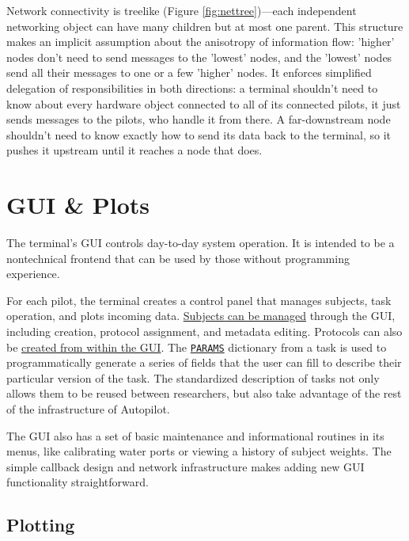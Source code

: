 \documentclass[nohyper, justified, notitlepage, marginals=raggedright,twoside=false,debug]{tufte-autopilot}
\begin{document}
Network connectivity is treelike (Figure \ref{fig:nettree})---each independent networking object can have many children but at most one parent. This structure makes an implicit assumption about the anisotropy of information flow: 'higher' nodes don't need to send messages to the 'lowest' nodes, and the 'lowest' nodes send all their messages to one or a few 'higher' nodes. It enforces simplified delegation of responsibilities in both directions: a terminal shouldn't need to know about every hardware object connected to all of its connected pilots, it just sends messages to the pilots, who handle it from there. A far-downstream node shouldn't need to know exactly how to send its data back to the terminal, so it pushes it upstream until it reaches a node that does.
\clearpage
\section{GUI \& Plots}
\label{sec:ui}

The terminal's GUI controls day-to-day system operation. It is intended to be a nontechnical frontend that can be used by those without programming experience. 

For each pilot, the terminal creates a control panel that manages subjects, task operation, and plots incoming data. \href{http://docs.auto-pi-lot.com/guide.training.html#creating-a-subject}{Subjects can be managed} through the GUI, including creation, protocol assignment, and metadata editing. Protocols can also be \href{http://docs.auto-pi-lot.com/guide.training.html#creating-a-protocol}{created from within the GUI}. The \hyperref[sec:taskcomponents]{\texttt{PARAMS}} dictionary from a task is used to programmatically generate a series of fields that the user can fill to describe their particular version of the task. The standardized description of tasks not only allows them to be reused between researchers, but also take advantage of the rest of the infrastructure of Autopilot.

The GUI also has a set of basic maintenance and informational routines in its menus, like calibrating water ports or viewing a history of subject weights. The simple callback design and network infrastructure makes adding new GUI functionality straightforward.

\subsection{Plotting}
\label{sec:plotting}
\end{document}
